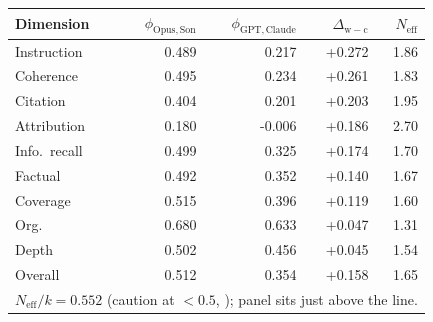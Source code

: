 \begin{tabular}{lrrrr}
\toprule
Dimension & $\phi_{\mathrm{Opus,Son}}$ & $\phi_{\mathrm{GPT,Claude}}$ & $\Delta_{\mathrm{w-c}}$ & $N_{\mathrm{eff}}$\\
\midrule
Instruction & 0.489 & 0.217 & +0.272 & 1.86 \\
Coherence & 0.495 & 0.234 & +0.261 & 1.83 \\
Citation & 0.404 & 0.201 & +0.203 & 1.95 \\
Attribution & 0.180 & -0.006 & +0.186 & 2.70 \\
Info.\ recall & 0.499 & 0.325 & +0.174 & 1.70 \\
Factual & 0.492 & 0.352 & +0.140 & 1.67 \\
Coverage & 0.515 & 0.396 & +0.119 & 1.60 \\
Org. & 0.680 & 0.633 & +0.047 & 1.31 \\
Depth & 0.502 & 0.456 & +0.045 & 1.54 \\
\midrule
Overall & 0.512 & 0.354 & +0.158 & 1.65 \\
\multicolumn{5}{l}{\footnotesize $N_{\mathrm{eff}}/k=0.552$ (caution at $<0.5$, \citep{kohli2026ninejudges}); panel sits just above the line.} \\
\bottomrule
\end{tabular}